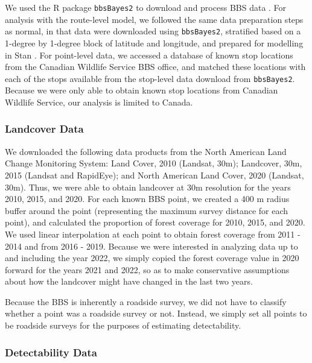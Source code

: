 \par We used the R package \texttt{bbsBayes2} to download and process BBS data \citep{edwards_bbsbayes_2021}. 
For analysis with the route-level model, we followed the same data preparation steps as normal, in that data were downloaded using \texttt{bbsBayes2}, stratified based on a 1-degree by 1-degree block of latitude and longitude, and prepared for modelling in Stan \citep{stan_development_team_stan_2024}.
For point-level data, we accessed a database of known stop locations from the Canadian Wildlife Service BBS office, and matched these locations with each of the stops available from the stop-level data download from \texttt{bbsBayes2}.
Because we were only able to obtain known stop locations from Canadian Wildlife Service, our analysis is limited to Canada.

\subsubsection{Landcover Data}

\par We downloaded the following data products from the North American Land Change Monitoring System: Land Cover, 2010 (Landsat, 30m); Landcover, 30m, 2015 (Landsat and RapidEye); and North American Land Cover, 2020 (Landsat, 30m).
Thus, we were able to obtain landcover at 30m resolution for the years 2010, 2015, and 2020. 
For each known BBS point, we created a 400 m radius buffer around the point (representing the maximum survey distance for each point), and calculated the proportion of forest coverage for 2010, 2015, and 2020. 
We used linear interpolation at each point to obtain forest coverage from 2011 - 2014 and from 2016 - 2019. 
Because we were interested in analyzing data up to and including the year 2022, we simply copied the forest coverage value in 2020 forward for the years 2021 and 2022, so as to make conservative assumptions about how the landcover might have changed in the last two years.

\par Because the BBS is inherently a roadside survey, we did not have to classify whether a point was a roadside survey or not.
Instead, we simply set all points to be roadside surveys for the purposes of estimating detectability.

\subsubsection{Detectability Data}

